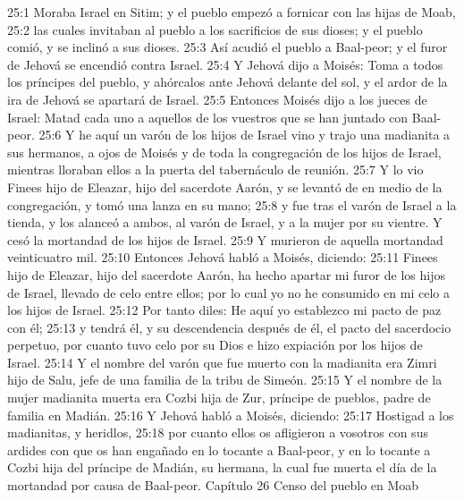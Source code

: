 25:1 Moraba Israel en Sitim; y el pueblo empezó a fornicar con las hijas de Moab,  
25:2 las cuales invitaban al pueblo a los sacrificios de sus dioses; y el pueblo comió, y se inclinó a sus dioses.  
25:3 Así acudió el pueblo a Baal-peor; y el furor de Jehová se encendió contra Israel.  
25:4 Y Jehová dijo a Moisés: Toma a todos los príncipes del pueblo, y ahórcalos ante Jehová delante del sol, y el ardor de la ira de Jehová se apartará de Israel.  
25:5 Entonces Moisés dijo a los jueces de Israel: Matad cada uno a aquellos de los vuestros que se han juntado con Baal-peor.  
25:6 Y he aquí un varón de los hijos de Israel vino y trajo una madianita a sus hermanos, a ojos de Moisés y de toda la congregación de los hijos de Israel, mientras lloraban ellos a la puerta del tabernáculo de reunión.  
25:7 Y lo vio Finees hijo de Eleazar, hijo del sacerdote Aarón, y se levantó de en medio de la congregación, y tomó una lanza en su mano;  
25:8 y fue tras el varón de Israel a la tienda, y los alanceó a ambos, al varón de Israel, y a la mujer por su vientre. Y cesó la mortandad de los hijos de Israel.  
25:9 Y murieron de aquella mortandad veinticuatro mil.  
25:10 Entonces Jehová habló a Moisés, diciendo:  
25:11 Finees hijo de Eleazar, hijo del sacerdote Aarón, ha hecho apartar mi furor de los hijos de Israel, llevado de celo entre ellos; por lo cual yo no he consumido en mi celo a los hijos de Israel.  
25:12 Por tanto diles: He aquí yo establezco mi pacto de paz con él;  
25:13 y tendrá él, y su descendencia después de él, el pacto del sacerdocio perpetuo, por cuanto tuvo celo por su Dios e hizo expiación por los hijos de Israel.  
25:14 Y el nombre del varón que fue muerto con la madianita era Zimri hijo de Salu, jefe de una familia de la tribu de Simeón.  
25:15 Y el nombre de la mujer madianita muerta era Cozbi hija de Zur, príncipe de pueblos, padre de familia en Madián.  
25:16 Y Jehová habló a Moisés, diciendo:  
25:17 Hostigad a los madianitas, y heridlos,  
25:18 por cuanto ellos os afligieron a vosotros con sus ardides con que os han engañado en lo tocante a Baal-peor, y en lo tocante a Cozbi hija del príncipe de Madián, su hermana, la cual fue muerta el día de la mortandad por causa de Baal-peor.  
Capítulo 26
Censo del pueblo en Moab  

